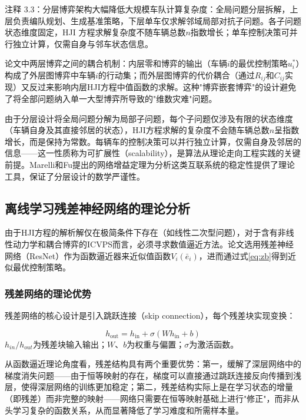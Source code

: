 \documentclass[10.5pt,a4paper,twoside,twocolumn]{ctexart}
\begin{document}
注释 3.3：分层博弈架构大幅降低大规模车队计算复杂度：全局问题分层拆解，上层负责编队规划、生成基准策略，下层单车仅求解邻域局部对抗子问题。各子问题状态维度固定，HJI 方程求解复杂度不随车辆总数$n$指数增长；单车控制决策可并行独立计算，仅需自身与邻车状态信息。

论文中两层博弈之间的耦合机制：内层零和博弈的输出（车辆$i$的最优控制策略$u_i^*$）构成了外层图博弈中车辆$i$的行动集；而外层图博弈的代价耦合（通过$R_{ij}$和$C_{ij}$实现）又反过来影响内层HJI方程中值函数的求解。这种"博弈嵌套博弈"的设计避免了将全部问题纳入单一大型博弈所导致的"维数灾难"问题。

由于分层设计将全局问题分解为局部子问题，每个子问题仅涉及有限的状态维度（车辆自身及其直接邻居的状态），HJI方程求解的复杂度不会随车辆总数$n$呈指数增长，而是保持为常数。每辆车的控制决策可以并行独立计算，仅需自身及邻居的信息——这一性质称为可扩展性（scalability），是算法从理论走向工程实践的关键前提。Marelli和Fu\cite{marelli2023}提出的网络增益定理为分析这类互联系统的稳定性提供了理论工具，保证了分层设计的数学严谨性。

\subsection{\heiti{} 离线学习残差神经网络的理论分析}

由于HJI方程的解析解仅在极简条件下存在（如线性二次型问题），对于含有非线性动力学和耦合博弈的ICVPS而言，必须寻求数值逼近方法。论文选用残差神经网络（ResNet）作为函数逼近器来近似值函数$V_i(\bar{e}_i)$，进而通过式\ref{eq:zb}得到近似最优控制策略。

\subsubsection{\heiti{} 残差网络的理论优势}

残差网络的核心设计是引入跳跃连接（skip connection），每个残差块实现变换：

\begin{equation}
h_{\text{out}} = h_{\text{in}} + \sigma(W h_{\text{in}} + b)
\label{eq:resnet}
\end{equation}
\(h_{in}/h_{out}\)为残差块输入输出；\(W、b\)为权重与偏置；\(\sigma\)为激活函数。

从函数逼近理论角度看，残差结构具有两个重要优势：第一，缓解了深层网络中的梯度消失问题——由于恒等映射的存在，梯度可以直接通过跳跃连接反向传播到浅层，使得深层网络的训练更加稳定；第二，残差结构实际上是在学习状态的增量（即残差）而非完整的映射——网络只需要在恒等映射基础上进行"修正"，而非从头学习复杂的函数关系，从而显著降低了学习难度和所需样本量。
\end{document}
